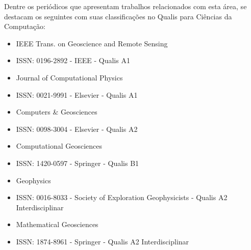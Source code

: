 Dentre os periódicos que apresentam trabalhos relacionados com esta área, se
destacam os seguintes com suas classificações no Qualis para Ciências da
Computação:

\begin{itemize}
  \setlength{\itemsep}{0pt}
  \setlength{\parskip}{0pt}
  \item IEEE Trans. on Geoscience and Remote Sensing
  \item ISSN: 0196-2892 - IEEE - Qualis A1
\end{itemize}

\begin{itemize}
  \setlength{\itemsep}{0pt}
  \setlength{\parskip}{0pt}
  \item Journal of Computational Physics
  \item ISSN: 0021-9991 - Elsevier - Qualis A1
\end{itemize}

\begin{itemize}
  \setlength{\itemsep}{0pt}
  \setlength{\parskip}{0pt}
  \item Computers \& Geosciences
  \item ISSN: 0098-3004 - Elsevier - Qualis A2
\end{itemize}


\begin{itemize}
  \setlength{\itemsep}{0pt}
  \setlength{\parskip}{0pt}
  \item Computational Geosciences
  \item ISSN: 1420-0597 - Springer - Qualis B1
\end{itemize}


\begin{itemize}
  \setlength{\itemsep}{0pt}
  \setlength{\parskip}{0pt}
  \item Geophysics
  \item ISSN: 0016-8033 - Society of Exploration Geophysicists - Qualis A2 Interdisciplinar
\end{itemize}


\begin{itemize}
  \setlength{\itemsep}{0pt}
  \setlength{\parskip}{0pt}
  \item Mathematical Geosciences
  \item ISSN: 1874-8961 - Springer - Qualis A2 Interdisciplinar
\end{itemize}

